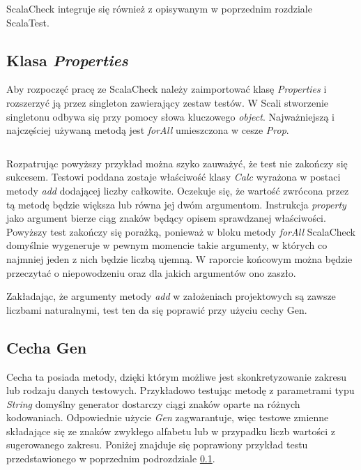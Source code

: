 \documentclass[brudnopis]{xmgr}
\begin{document}
ScalaCheck integruje się również z opisywanym w poprzednim rozdziale ScalaTest.

\subsection{Klasa \emph{Properties}}

\label{scalaCheck:properties}

Aby rozpoczęć pracę ze ScalaCheck należy zaimportować klasę \emph{Properties} i rozszerzyć ją przez singleton zawierający zestaw testów. W Scali stworzenie singletonu odbywa się przy pomocy słowa kluczowego \emph{object}. Najważniejszą i najczęściej używaną metodą jest \emph{forAll} umieszczona w cesze \emph{Prop}.

\inputminted[fontsize=\small]{scala}{code/CalcTestBad.scala}

Rozpatrując powyższy przykład można szyko zauważyć, że test nie zakończy się sukcesem. Testowi poddana zostaje właściwość klasy \emph{Calc} wyrażona w postaci metody \emph{add} dodającej liczby całkowite. Oczekuje się, że wartość zwrócona przez tą metodę będzie większa lub równa jej dwóm argumentom. Instrukcja \emph{property} jako argument bierze ciąg znaków będący opisem sprawdzanej właściwości. Powyższy test zakończy się porażką, ponieważ w bloku metody \emph{forAll} ScalaCheck domyślnie wygeneruje w pewnym momencie takie argumenty, w których co najmniej jeden z nich będzie liczbą ujemną. W raporcie końcowym można będzie przeczytać o niepowodzeniu oraz dla jakich argumentów ono zaszło.

Zakładając, że argumenty metody \emph{add} w założeniach projektowych są zawsze liczbami naturalnymi, test ten da się poprawić przy użyciu cechy Gen.

\subsection{Cecha Gen} 

Cecha ta posiada metody, dzięki którym możliwe jest skonkretyzowanie zakresu lub rodzaju danych testowych. Przykładowo testując metodę z parametrami typu \emph{String} domyślny generator dostarczy ciągi znaków oparte na różnych kodowaniach. Odpowiednie użycie \emph{Gen} zagwarantuje, więc testowe zmienne składające się ze znaków zwykłego alfabetu lub w przypadku liczb wartości z sugerowanego zakresu. Poniżej znajduje się poprawiony przykład testu przedstawionego w poprzednim podrozdziale \ref{scalaCheck:properties}.
\end{document}
